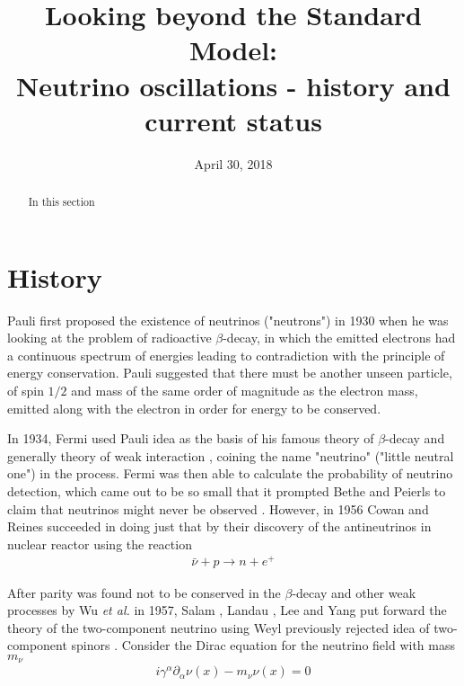 \documentclass[english]{article}
\begin{document}
\title{Looking beyond the Standard Model: \\Neutrino oscillations - history and current status}
\author{}
\date{April 30, 2018}
\maketitle

\thispagestyle{fancy}

\begin{abstract}
In this section
\end{abstract}

\section{History}
	Pauli first proposed the existence of neutrinos ("neutrons") in 1930 \cite{pauliletter1930} when he was looking at the problem of radioactive $\beta$-decay, in which the emitted electrons had a continuous spectrum of energies leading to contradiction with the principle of energy conservation. Pauli suggested that there must be another unseen particle, of spin $1/2$ and mass of the same order of magnitude as the electron mass, emitted along with the electron in order for energy to be conserved.
    
    In 1934, Fermi used Pauli idea as the basis of his famous theory of $\beta$-decay and generally theory of weak interaction \cite{fermi1934}, coining the name "neutrino" ("little neutral one") in the process. Fermi was then able to calculate the probability of neutrino detection, which came out to be so small that it prompted Bethe and Peierls to claim that neutrinos might never be observed \cite{bethepeierls1934}. However, in 1956 Cowan and Reines succeeded in doing just that \cite{cowanreines1956} by their discovery of the antineutrinos in nuclear reactor using the reaction
    \begin{gather}
    	\bar{\nu}+p \rightarrow n+e^{+}
    \end{gather}
    
    After parity was found not to be conserved in the $\beta$-decay and other weak processes \cite{wu1957} by Wu \textit{et al.} in 1957, Salam \cite{salam1956}, Landau \cite{landau1957}, Lee and Yang \cite{leeyang1957} put forward the theory of the two-component neutrino using Weyl previously rejected idea of two-component spinors \cite{weyl1929}. Consider the Dirac equation for the neutrino field with mass $m_{\nu}$
    \begin{gather}
    	i\gamma^{\alpha} \partial_{\alpha} \nu (x) - m_{\nu} \nu (x) = 0
    \end{gather}
    
\end{document}

